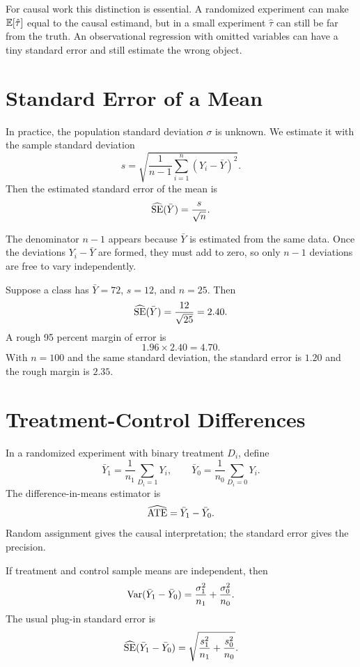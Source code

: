 For causal work this distinction is essential. A randomized experiment can
make $\mathbb{E}[\hat{\tau}]$ equal to the causal estimand, but in a small experiment
$\hat{\tau}$ can still be far from the truth. An observational regression with
omitted variables can have a tiny standard error and still estimate the wrong
object.

\section{Standard Error of a Mean}

In practice, the population standard deviation $\sigma$ is unknown. We estimate
it with the sample standard deviation
\[
  s
  =
  \sqrt{
    \frac{1}{n-1}\sum_{i=1}^n (Y_i-\bar{Y})^2
  }.
\]
Then the estimated standard error of the mean is
\[
  \widehat{\mathrm{SE}}(\bar{Y})=\frac{s}{\sqrt{n}}.
\]

The denominator $n-1$ appears because $\bar{Y}$ is estimated from the same data.
Once the deviations $Y_i-\bar{Y}$ are formed, they must add to zero, so only
$n-1$ deviations are free to vary independently.

\begin{exmp}
Suppose a class has $\bar{Y}=72$, $s=12$, and $n=25$. Then
\[
  \widehat{\mathrm{SE}}(\bar{Y}) = \frac{12}{\sqrt{25}} = 2.40.
\]
A rough 95 percent margin of error is
\[
  1.96 \times 2.40 = 4.70.
\]
With $n=100$ and the same standard deviation, the standard error is $1.20$ and
the rough margin is $2.35$.
\end{exmp}

\section{Treatment-Control Differences}

In a randomized experiment with binary treatment $D_i$, define
\[
  \bar{Y}_1 = \frac{1}{n_1}\sum_{D_i=1}Y_i,
  \qquad
  \bar{Y}_0 = \frac{1}{n_0}\sum_{D_i=0}Y_i.
\]
The difference-in-means estimator is
\[
  \widehat{\mathrm{ATE}} = \bar{Y}_1-\bar{Y}_0.
\]
Random assignment gives the causal interpretation; the standard error gives
the precision.

\begin{thmN}
If treatment and control sample means are independent, then
\[
  \mathrm{Var}(\bar{Y}_1-\bar{Y}_0)
  =
  \frac{\sigma_1^2}{n_1}
  +
  \frac{\sigma_0^2}{n_0}.
\]
The usual plug-in standard error is
\[
  \widehat{\mathrm{SE}}(\bar{Y}_1-\bar{Y}_0)
  =
  \sqrt{
    \frac{s_1^2}{n_1}
    +
    \frac{s_0^2}{n_0}
  }.
\]
\end{thmN}

